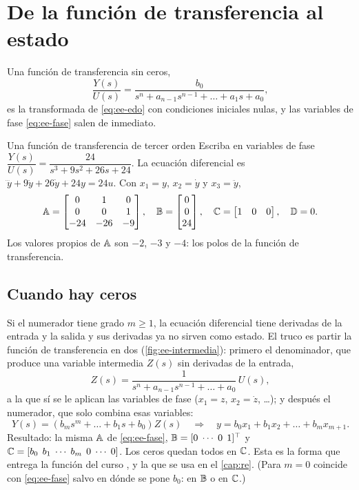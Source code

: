 \section{De la función de transferencia al estado}
\label{sec:ee-ft-estado}

Una función de transferencia sin ceros,
\[
  \frac{Y(s)}{U(s)}=\frac{b_0}{s^n+a_{n-1}s^{n-1}+\dots+a_1s+a_0},
\]
es la transformada de \eqref{eq:ee-edo} con condiciones iniciales nulas, y las variables de fase \eqref{eq:ee-fase} salen de inmediato.

\begin{ejemplo}[label=ej:ee-fase]{Una función de transferencia de tercer orden}
Escriba en variables de fase $\dfrac{Y(s)}{U(s)}=\dfrac{24}{s^3+9s^2+26s+24}$.
\solucion La ecuación diferencial es $\dddot y+9\ddot y+26\dot y+24y=24u$. Con $x_1=y$, $x_2=\dot y$ y $x_3=\ddot y$,
\[
  \mathbb{A}=\begin{bmatrix}0&1&0\\0&0&1\\-24&-26&-9\end{bmatrix},\quad
  \mathbb{B}=\begin{bmatrix}0\\0\\24\end{bmatrix},\quad
  \mathbb{C}=\begin{bmatrix}1&0&0\end{bmatrix},\quad\mathbb{D}=0 .
\]
Los valores propios de $\mathbb{A}$ son $-2$, $-3$ y $-4$: los polos de la función de transferencia.
\end{ejemplo}

\subsection{Cuando hay ceros}

Si el numerador tiene grado $m\ge1$, la ecuación diferencial tiene derivadas de la entrada y la salida y sus derivadas ya no sirven como estado. El truco es partir la función de transferencia en dos (\cref{fig:ee-intermedia}): primero el denominador, que produce una variable intermedia $Z(s)$ sin derivadas de la entrada,
\[
  Z(s)=\frac{1}{s^n+a_{n-1}s^{n-1}+\dots+a_0}\,U(s),
\]
a la que sí se le aplican las variables de fase ($x_1=z$, $x_2=\dot z$, \dots); y después el numerador, que solo combina esas variables:
\[
  Y(s)=(b_ms^m+\dots+b_1s+b_0)Z(s)\quad\Longrightarrow\quad y=b_0x_1+b_1x_2+\dots+b_mx_{m+1}.
\]
Resultado: la misma $\mathbb{A}$ de \eqref{eq:ee-fase}, $\mathbb{B}=[0\;\cdots\;0\;\,1]^\top$ y $\mathbb{C}=[b_0\;\,b_1\;\cdots\;b_m\;\,0\;\cdots\;0]$. Los ceros quedan todos en $\mathbb{C}$. Esta es la forma que entrega la función del curso , y la que se usa en el \cref{cap:re}. (Para $m=0$ coincide con \eqref{eq:ee-fase} salvo en dónde se pone $b_0$: en $\mathbb{B}$ o en $\mathbb{C}$.)

